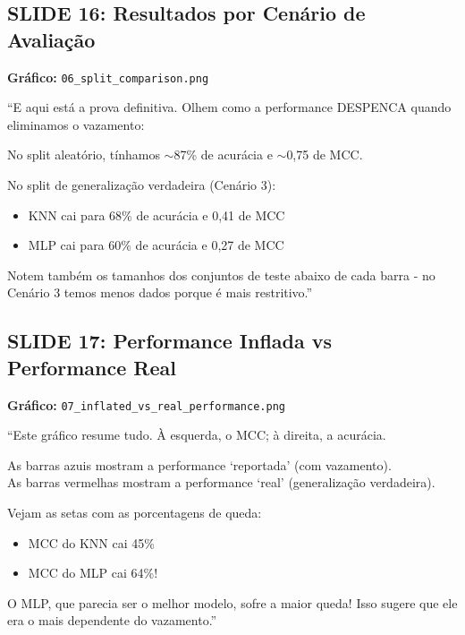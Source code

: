 \documentclass[11pt,a4paper]{article}
\begin{document}
\subsection{SLIDE 16: Resultados por Cenário de Avaliação}

\textbf{Gráfico:} \texttt{06\_split\_comparison.png}

\begin{oquedizer}
``E aqui está a prova definitiva. Olhem como a performance DESPENCA quando eliminamos o vazamento:

No split aleatório, tínhamos $\sim$87\% de acurácia e $\sim$0,75 de MCC.

No split de generalização verdadeira (Cenário 3):
\begin{itemize}
    \item KNN cai para 68\% de acurácia e 0,41 de MCC
    \item MLP cai para 60\% de acurácia e 0,27 de MCC
\end{itemize}

Notem também os tamanhos dos conjuntos de teste abaixo de cada barra - no Cenário 3 temos menos dados porque é mais restritivo.''
\end{oquedizer}

\subsection{SLIDE 17: Performance Inflada vs Performance Real}

\textbf{Gráfico:} \texttt{07\_inflated\_vs\_real\_performance.png}

\begin{oquedizer}
``Este gráfico resume tudo. À esquerda, o MCC; à direita, a acurácia.

As barras azuis mostram a performance `reportada' (com vazamento).\\
As barras vermelhas mostram a performance `real' (generalização verdadeira).

Vejam as setas com as porcentagens de queda:
\begin{itemize}
    \item MCC do KNN cai 45\%
    \item MCC do MLP cai 64\%!
\end{itemize}

O MLP, que parecia ser o melhor modelo, sofre a maior queda! Isso sugere que ele era o mais dependente do vazamento.''
\end{oquedizer}
\end{document}
